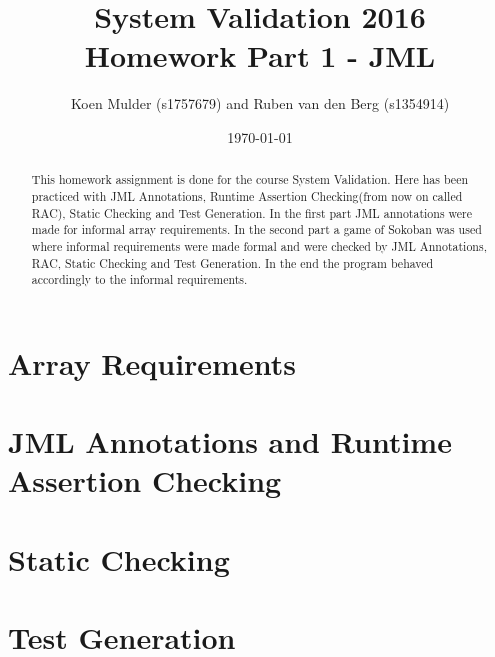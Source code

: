 \documentclass[a4paper]{article}
\title{System Validation 2016 \\ Homework Part 1 - JML}
\author{Koen Mulder (s1757679) and Ruben van den Berg (s1354914)}
\date{\today}
\begin{document}
\maketitle

\begin{abstract}
This homework assignment is done for the course System Validation. Here has been practiced with JML Annotations, Runtime Assertion Checking(from now on called RAC), Static Checking and Test Generation. In the first part JML annotations were made for informal array requirements. In the second part a game of Sokoban was used where informal requirements were made formal and were checked by JML Annotations, RAC, Static Checking and Test Generation. In the end the program behaved accordingly to the informal requirements. 
\end{abstract}

\section{Array Requirements}


\section{JML Annotations and Runtime Assertion Checking}


\section{Static Checking}


\section{Test Generation}
\end{document}
